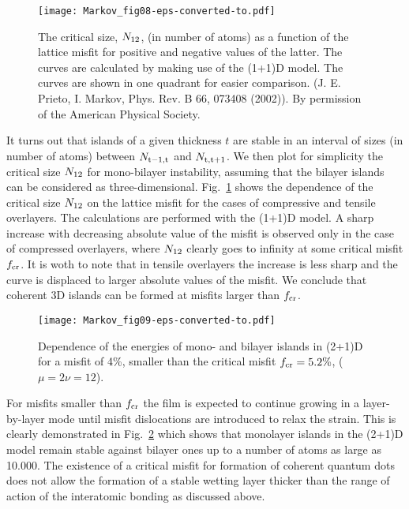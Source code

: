 \documentclass[aps,prl,showpacs,twocolumn,byrevtex,floatfix]{revtex4-1}
\begin{document}
\begin{figure}[htb]
\texttt{[image: Markov\_fig08-eps-converted-to.pdf]}
\caption{\label{en12} The critical size, $N_{\rm 12}$, (in number of atoms)
as a function of the lattice misfit for positive and negative values of the
latter. The curves are calculated by making use of the (1+1)D model. The curves
are shown in one quadrant for easier comparison. (J. E. Prieto, I. Markov, Phys.
Rev. B 66, 073408 (2002)). By permission of the American Physical Society.}
\end{figure}


It turns out that islands of a given thickness $t$ are stable in an interval of
sizes (in number of atoms) between $N_{\rm t-1,t}$ and $N_{\rm t, t+1}$. We then
plot for simplicity the critical size $N_{\rm 12}$ for mono-bilayer
instability, assuming that the bilayer islands can be considered as
three-dimensional. Fig.\ \ref{en12} shows the dependence of the critical size
$N_{\rm 12}$ on the lattice misfit for the cases of compressive and 
tensile overlayers. 
The calculations are performed with the (1+1)D model.\cite{Prieto02} A sharp
increase with decreasing absolute value of the misfit is observed only in the
case of compressed overlayers, where $N_{\rm 12}$ clearly goes to infinity at
some critical misfit $f_{\rm cr}$. It is woth to note that in tensile overlayers
the increase is less sharp and the curve is displaced to larger absolute values
of the misfit. We conclude that coherent 3D islands can be formed at misfits
larger than $f_{\rm cr}$.

\begin{figure}[htb]
\texttt{[image: Markov\_fig09-eps-converted-to.pdf]}
\caption{\label{smallmisfit} Dependence of the energies of mono- and bilayer
islands in (2+1)D for a misfit of 4\%, smaller than the critical misfit $f_{\rm
cr} = 5.2\%$, ($\mu = 2\nu = 12$).}
\end{figure}

For misfits smaller than $f_{\rm cr}$ the film is expected to continue growing
in a layer-by-layer mode until misfit dislocations are introduced to relax the
strain. This is clearly demonstrated in Fig.\ \ref{smallmisfit} which shows that
monolayer islands in the (2+1)D model remain stable against bilayer ones up to a
number of atoms as large as 10.000. The existence of a critical misfit for
formation of coherent quantum dots does not allow the formation of a stable
wetting layer thicker than the range of action of the interatomic bonding
as discussed above.
\end{document}
